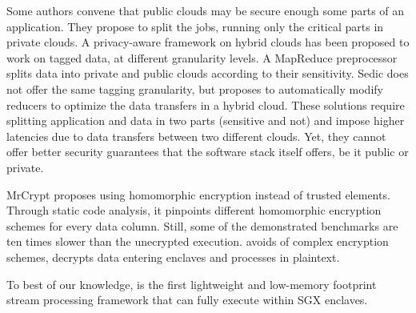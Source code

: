 Some authors convene that public clouds may be secure enough some parts of an application.
They propose to split the jobs, running only the critical parts in private clouds.
A privacy-aware framework on hybrid clouds \cite{xu2015framework} has been proposed to work on tagged data, at different granularity levels.
A MapReduce preprocessor splits data into private and public clouds according to their sensitivity.
Sedic \cite{zhang2011sedic} does not offer the same tagging granularity, but proposes to automatically modify reducers to optimize the data transfers in a hybrid cloud.
These solutions require splitting application and data in two parts (sensitive and not) and impose higher latencies due to data transfers between two different clouds.
Yet, they cannot offer better security guarantees that the software stack itself offers, be it public or private.

MrCrypt \cite{tetali2013mrcrypt} proposes using homomorphic encryption instead of trusted elements.
Through static code analysis, it pinpoints different homomorphic encryption schemes for every data column.
Still, some of the demonstrated benchmarks are ten times slower than the unecrypted execution.
\SYS{} avoids of complex encryption schemes, decrypts data entering enclaves and processes in plaintext.

To best of our knowledge, \SYS{} is the first lightweight and low-memory footprint stream processing framework that can fully execute within SGX enclaves.
